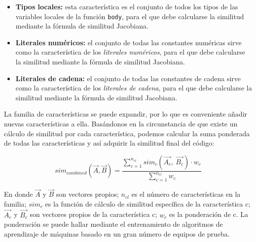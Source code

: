 \begin{itemize}
	\item \textbf{Tipos locales:} esta característica es el conjunto de todos los tipos de las variables locales de la función \texttt{body}, para el que debe calcularse la similitud mediante la fórmula de similitud Jacobiana.

	\item \textbf{Literales numéricos:} el conjunto de todas las constantes numéricas sirve como la característica de los \textit{literales numéricos}, para el que debe calcularse la similitud mediante la fórmula de similitud Jacobiana.

	\item \textbf{Literales de cadena:} el conjunto de todas las constantes de cadena sirve como la característica de los \textit{literales de cadena}, para el que debe calcularse la similitud mediante la fórmula de similitud Jacobiana.
\end{itemize}

La familia de características se puede expandir, por lo que es conveniente añadir nuevas características a ella. Basándonos en la circunstancia de que existe un cálculo de similitud por cada característica, podemos calcular la suma ponderada de todas las características y así adquirir la similitud final del código:

\begin{equation}
	sim_{combined}(\vec{A}, \vec{B})=\frac{\sum_{c=1}^{n_{cl}}sim_{c}(\vec{A_c},~\vec{B_c})\cdot w_{c}}{\sum_{c=1}^{n_{cl}}w_{c}}
\end{equation}

En donde $\vec{A}$ y $\vec{B}$ son vectores propios; $n_{cl}$ es el número de características en la familia; $sim_{c}$ es la función de cálculo de similitud específica de la característica c; $\vec{A_c}$ y $\vec{B_c}$ son vectores propios de la característica c; $w_{c}$ es la ponderación de c. La ponderación se puede hallar mediante el entrenamiento de algoritmos de aprendizaje de máquinas basado en un gran número de equipos de prueba.